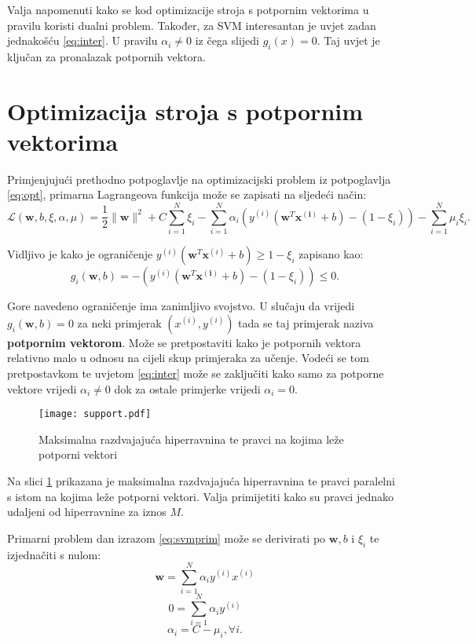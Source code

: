 \documentclass[times, utf8, zavrsni, numeric]{fer}
\begin{document}
Valja napomenuti kako se kod optimizacije stroja s potpornim vektorima u pravilu koristi dualni problem.
Također, za SVM interesantan je uvjet zadan jednakošću \ref{eq:inter}. U pravilu $\alpha_i \neq 0$ iz čega
slijedi $g_i(x) = 0$. Taj uvjet je ključan za pronalazak potpornih vektora.

\section{Optimizacija stroja s potpornim vektorima} \label{sec:svmopt}
Primjenjujući prethodno potpoglavlje na optimizacijski problem 
iz potpoglavlja \ref{eq:opt}, primarna Lagrangeova funkcija može se zapisati
na sljedeći način:
\begin{equation} \label{eq:svmprim}
  \mathcal{L}(\mathbf{w}, b, \xi,\alpha, \mu) = \frac{1}{2}\|\mathbf{w}\|^2 + C\sum_{i=1}^{N} \xi_i
  - \sum_{i=1}^{N} \alpha_i(y^{(i)}(\mathbf{w}^T\mathbf{x^{(i)}} + b) - (1 - \xi_i))
  - \sum_{i=1}^{N} \mu_i\xi_i.
\end{equation}

Vidljivo je kako je ograničenje $y^{(i)}(\mathbf{w}^T\mathbf{x}^{(i)} + b) \geq 1 - \xi_i$ zapisano
kao:
\begin{equation*}
  g_i(\mathbf{w}, b) = - (y^{(i)}(\mathbf{w}^T\mathbf{x^{(i)}} + b) - (1 - \xi_i)) \leq 0.
\end{equation*}

Gore navedeno ograničenje ima zanimljivo svojstvo. 
U slučaju da vrijedi $g_i(\mathbf{w}, b) = 0$ za neki primjerak $(x^{(i)}, y^{(i)})$ tada
se taj primjerak naziva \textbf{potpornim vektorom}. Može se pretpostaviti kako je potpornih vektora 
relativno malo u odnosu na cijeli skup primjeraka za učenje. Vodeći se tom pretpostavkom te uvjetom \ref{eq:inter}
može se zaključiti kako samo za potporne vektore vrijedi $\alpha_i \neq 0$ dok za ostale primjerke vrijedi 
$\alpha_i = 0$.

\begin{figure}
\centering
\texttt{[image: support.pdf]}
\caption{Maksimalna razdvajajuća hiperravnina te pravci na kojima leže potporni vektori}
\label{fig:support}
\end{figure}

Na slici \ref{fig:support} prikazana je maksimalna razdvajajuća hiperravnina te pravci paralelni s istom 
na kojima leže potporni vektori. Valja primijetiti kako su pravci jednako udaljeni od hiperravnine za
iznos $M$.

\par Primarni problem dan izrazom \ref{eq:svmprim} može se derivirati po $\mathbf{w}, b$ i $\xi_i$
te izjednačiti s nulom:
\begin{equation}
  \mathbf{w} = \sum_{i=1}^{N} \alpha_iy^{(i)}x^{(i)}
\end{equation}
\begin{equation} \label{eq:dualcomp}
  0 = \sum_{i=1}^{N} \alpha_iy^{(i)}
\end{equation} 
\begin{equation}
  \alpha_i = C - \mu_i, \forall i.
\end{equation}
\end{document}
